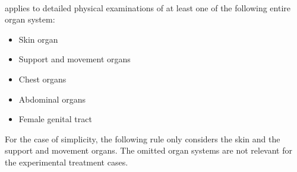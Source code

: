 

\paragraph{}
 applies to detailed physical examinations of at least one of the following entire organ system:
\begin{itemize}
    \item Skin organ
    \item Support and movement organs
    \item Chest organs
    \item Abdominal organs
    \item Female genital tract
\end{itemize}
For the case of simplicity, the following rule only considers the skin and the support and movement organs.
The omitted organ systems are not relevant for the experimental treatment cases.



